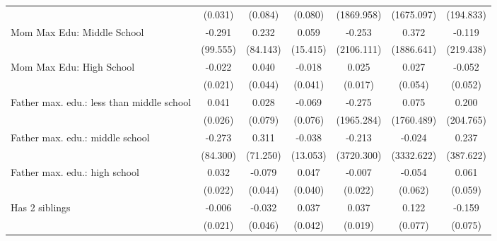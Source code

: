 {\begin{tabular}{l*{6}{c}}
                    &     (0.031)         &     (0.084)         &     (0.080)         &  (1869.958)         &  (1675.097)         &   (194.833)         \\
\addlinespace
Mom Max Edu: Middle School&      -0.291         &       0.232         &       0.059         &      -0.253         &       0.372         &      -0.119         \\
                    &    (99.555)         &    (84.143)         &    (15.415)         &  (2106.111)         &  (1886.641)         &   (219.438)         \\
\addlinespace
Mom Max Edu: High School&      -0.022         &       0.040         &      -0.018         &       0.025         &       0.027         &      -0.052         \\
                    &     (0.021)         &     (0.044)         &     (0.041)         &     (0.017)         &     (0.054)         &     (0.052)         \\
\addlinespace
Father max. edu.: less than middle school&       0.041         &       0.028         &      -0.069         &      -0.275         &       0.075         &       0.200         \\
                    &     (0.026)         &     (0.079)         &     (0.076)         &  (1965.284)         &  (1760.489)         &   (204.765)         \\
\addlinespace
Father max. edu.: middle school&      -0.273         &       0.311         &      -0.038         &      -0.213         &      -0.024         &       0.237         \\
                    &    (84.300)         &    (71.250)         &    (13.053)         &  (3720.300)         &  (3332.622)         &   (387.622)         \\
\addlinespace
Father max. edu.: high school&       0.032         &      -0.079         &       0.047         &      -0.007         &      -0.054         &       0.061         \\
                    &     (0.022)         &     (0.044)         &     (0.040)         &     (0.022)         &     (0.062)         &     (0.059)         \\
\addlinespace
Has 2 siblings      &      -0.006         &      -0.032         &       0.037         &       0.037         &       0.122         &      -0.159\sym{*}  \\
                    &     (0.021)         &     (0.046)         &     (0.042)         &     (0.019)         &     (0.077)         &     (0.075)         \\

\end{tabular}}
